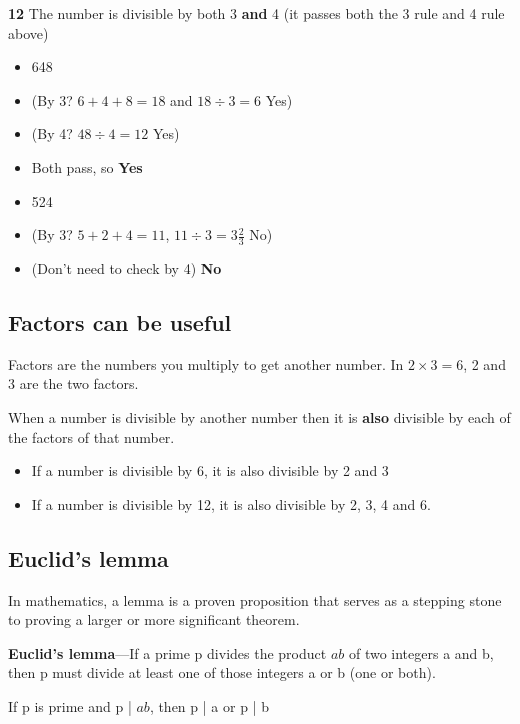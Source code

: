 \vspace{7 mm}

\textbf{12} The number is divisible by both 3 \textbf{and} 4 (it passes both the 3 rule and 4 rule above)

\begin{itemize}
  \item 648
  \item (By 3? $6+4+8=18$ and $18\div 3=6$ Yes)
  \item (By 4? $48\div 4=12$ Yes)
  \item Both pass, so \textbf{Yes}
\end{itemize}

\begin{itemize}
  \item 524
  \item (By 3? $5+2+4=11$, $11\div 3=3\frac{2}{3}$ No)
  \item (Don't need to check by 4) \textbf{No}
\end{itemize}

\subsection{Factors can be useful}

Factors are the numbers you multiply to get another number. In $2 \times 3=6$, 2 and 3 are the two factors.

When a number is divisible by another number then it is \textbf{also} divisible by each of the factors of that number.

\begin{itemize}
  \item If a number is divisible by 6, it is also divisible by 2 and 3
  \item If a number is divisible by 12, it is also divisible by 2, 3, 4 and 6.
\end{itemize}

\subsection{Euclid's lemma}

In mathematics, a lemma is a proven proposition that serves as a stepping stone to proving a larger or more significant theorem.

\textbf{Euclid's lemma}—If a prime p divides the product $ab$ of two integers a and b, then p must divide at least one of those integers a or b (one or both).

If p is prime and p | $ab$, then p | a or p | b
